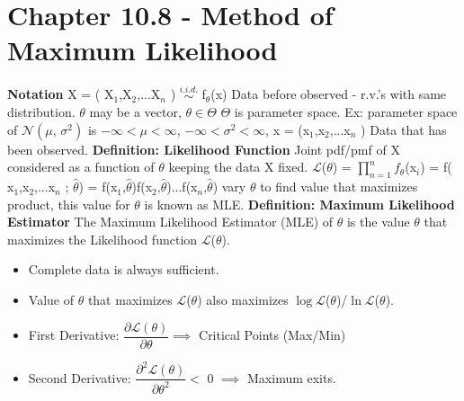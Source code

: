 \documentclass[]{article}
\begin{document}
\section{Chapter 10.8 - Method of Maximum Likelihood}
\Large\textbf{Notation}
\newline X = ( X$_1$,X$_2$,...X$_n$ )  $\stackrel{i.i.d.}{\sim}$ f$_\theta$(x)  \newline Data before observed - r.v.'s with same distribution.
\newline
\newline $\theta$ may be a vector, $\theta \in \Theta$
\newline
\newline $\Theta$ is parameter space. 
\newline Ex: parameter space of $\mathcal{N}(\mu,\,\sigma^{2})$ is $-\infty < \mu < \infty$, $-\infty < \sigma^2 < \infty$,
\newline
\newline x = (x$_1$,x$_2$,...x$_n$ )   Data that has been observed.
\newline
\newline 
\Large\textbf{Definition: Likelihood Function}
\newline Joint pdf/pmf of X considered as a function of $\theta$ keeping the data X fixed.
\newline
\newline $\mathcal{L}$($\theta$) = $\displaystyle\prod_{n=1}^{n} f_\theta$(x$_i$)  =  f( x$_1$,x$_2$,...x$_n$ ; $\hat\theta$) = f(x$_1$,$\hat\theta$)f(x$_2$,$\hat\theta$)...f(x$_n$,$\hat\theta$)
\newline
\newline vary $\theta$ to find value that maximizes product, this value for $\theta$ is known as MLE.
\newline
\newline
\Large\textbf{Definition: Maximum Likelihood Estimator}
\newline The Maximum Likelihood Estimator (MLE) of $\theta$ is the value $\theta$ that maximizes the Likelihood function $\mathcal{L}$($\theta$).
\begin{itemize}
	\item Complete  data is always sufficient.
	\item Value of $\theta$ that maximizes $\mathcal{L}$($\theta$) also maximizes $\log\mathcal{L}$($\theta$)/$\ln\mathcal{L}$($\theta$). 	
	\item First Derivative: $\dfrac{\partial\mathcal{L}(\theta)  }{\partial\theta} \implies$ Critical Points (Max/Min)
	\item Second Derivative: $\dfrac{\partial^2\mathcal{L}(\theta)  }{\partial\theta^2} < $ 0 $\implies$  Maximum exits.\newline
\end{itemize}
\end{document}

